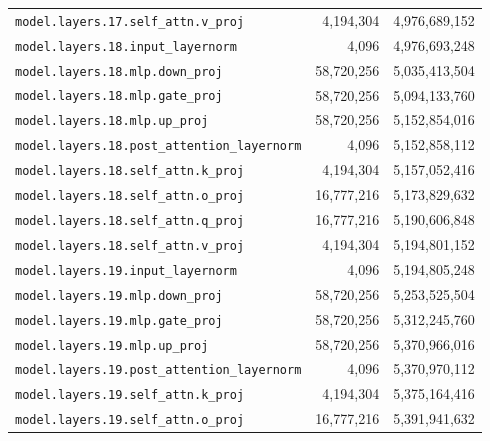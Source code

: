 \documentclass[10pt,a4paper]{article}
\theoremstyle{definition}
\begin{document}
\begin{appendices}
\begin{longtable}{p{9.5cm}rr}
\texttt{model.\allowbreak{}layers.\allowbreak{}17.\allowbreak{}self\_attn.\allowbreak{}v\_proj} & 4,194,304 & 4,976,689,152 \\
\texttt{model.\allowbreak{}layers.\allowbreak{}18.\allowbreak{}input\_layernorm} & 4,096 & 4,976,693,248 \\
\texttt{model.\allowbreak{}layers.\allowbreak{}18.\allowbreak{}mlp.\allowbreak{}down\_proj} & 58,720,256 & 5,035,413,504 \\
\texttt{model.\allowbreak{}layers.\allowbreak{}18.\allowbreak{}mlp.\allowbreak{}gate\_proj} & 58,720,256 & 5,094,133,760 \\
\texttt{model.\allowbreak{}layers.\allowbreak{}18.\allowbreak{}mlp.\allowbreak{}up\_proj} & 58,720,256 & 5,152,854,016 \\
\texttt{model.\allowbreak{}layers.\allowbreak{}18.\allowbreak{}post\_attention\_layernorm} & 4,096 & 5,152,858,112 \\
\texttt{model.\allowbreak{}layers.\allowbreak{}18.\allowbreak{}self\_attn.\allowbreak{}k\_proj} & 4,194,304 & 5,157,052,416 \\
\texttt{model.\allowbreak{}layers.\allowbreak{}18.\allowbreak{}self\_attn.\allowbreak{}o\_proj} & 16,777,216 & 5,173,829,632 \\
\texttt{model.\allowbreak{}layers.\allowbreak{}18.\allowbreak{}self\_attn.\allowbreak{}q\_proj} & 16,777,216 & 5,190,606,848 \\
\texttt{model.\allowbreak{}layers.\allowbreak{}18.\allowbreak{}self\_attn.\allowbreak{}v\_proj} & 4,194,304 & 5,194,801,152 \\
\texttt{model.\allowbreak{}layers.\allowbreak{}19.\allowbreak{}input\_layernorm} & 4,096 & 5,194,805,248 \\
\texttt{model.\allowbreak{}layers.\allowbreak{}19.\allowbreak{}mlp.\allowbreak{}down\_proj} & 58,720,256 & 5,253,525,504 \\
\texttt{model.\allowbreak{}layers.\allowbreak{}19.\allowbreak{}mlp.\allowbreak{}gate\_proj} & 58,720,256 & 5,312,245,760 \\
\texttt{model.\allowbreak{}layers.\allowbreak{}19.\allowbreak{}mlp.\allowbreak{}up\_proj} & 58,720,256 & 5,370,966,016 \\
\texttt{model.\allowbreak{}layers.\allowbreak{}19.\allowbreak{}post\_attention\_layernorm} & 4,096 & 5,370,970,112 \\
\texttt{model.\allowbreak{}layers.\allowbreak{}19.\allowbreak{}self\_attn.\allowbreak{}k\_proj} & 4,194,304 & 5,375,164,416 \\
\texttt{model.\allowbreak{}layers.\allowbreak{}19.\allowbreak{}self\_attn.\allowbreak{}o\_proj} & 16,777,216 & 5,391,941,632 \\

\end{longtable}
\end{appendices}
\end{document}
